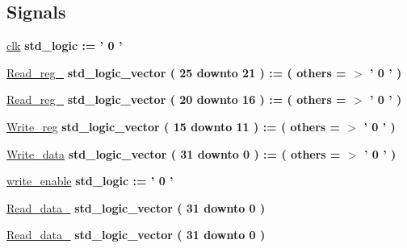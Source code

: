\subsection*{\-Signals}
 \begin{DoxyCompactItemize}
\item 
\hyperlink{classregister__file__tb_1_1behavior_a3bcdf21e7dd60246a06d6c1fab716073}{clk} {\bfseries std\-\_\-logic  \-:= '  0  ' } 
\item 
\hyperlink{classregister__file__tb_1_1behavior_aa0da7077dfd273150f20882878fdc3f0}{\-Read\-\_\-reg\-\_} {\bfseries std\-\_\-logic\-\_\-vector (   25    downto    21  )  \-:= (  others  = $>$ '  0  '  ) } 
\item 
\hyperlink{classregister__file__tb_1_1behavior_a96cae136f8beb7b9459dd4d533d63b48}{\-Read\-\_\-reg\-\_} {\bfseries std\-\_\-logic\-\_\-vector (   20    downto    16  )  \-:= (  others  = $>$ '  0  '  ) } 
\item 
\hyperlink{classregister__file__tb_1_1behavior_a418f436f7f50b54e93d3eb60399ac06d}{\-Write\-\_\-reg} {\bfseries std\-\_\-logic\-\_\-vector (   15    downto    11  )  \-:= (  others  = $>$ '  0  '  ) } 
\item 
\hyperlink{classregister__file__tb_1_1behavior_ab01d9a5bc12390a056a5af5563cb38ef}{\-Write\-\_\-data} {\bfseries std\-\_\-logic\-\_\-vector (   31    downto    0  )  \-:= (  others  = $>$ '  0  '  ) } 
\item 
\hyperlink{classregister__file__tb_1_1behavior_a03e4a4185b49fe459c673dd62519a014}{write\-\_\-enable} {\bfseries std\-\_\-logic  \-:= '  0  ' } 
\item 
\hyperlink{classregister__file__tb_1_1behavior_a52d099ba211189fcde4bdd91c2dc9e3c}{\-Read\-\_\-data\-\_} {\bfseries std\-\_\-logic\-\_\-vector (   31    downto    0  ) } 
\item 
\hyperlink{classregister__file__tb_1_1behavior_ad80374a8a0d8eac296faebd14282884c}{\-Read\-\_\-data\-\_} {\bfseries std\-\_\-logic\-\_\-vector (   31    downto    0  ) } 
\end{DoxyCompactItemize}


